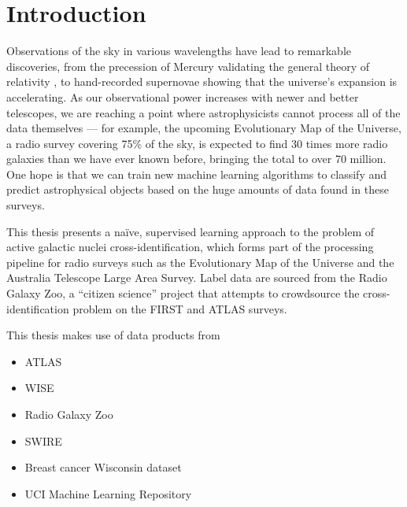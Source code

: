
\chapter{Introduction}
\label{cha:intro}

Observations of the sky in various wavelengths have lead to remarkable discoveries, from the precession of Mercury validating the general theory of relativity , to hand-recorded supernovae showing that the universe's expansion is accelerating. As our observational power increases with newer and better telescopes, we are reaching a point where astrophysicists cannot process all of the data themselves --- for example, the upcoming Evolutionary Map of the Universe, a radio survey covering 75\% of the sky, is expected to find 30 times more radio galaxies than we have ever known before, bringing the total to over 70 million. One hope is that we can train new machine learning algorithms to classify and predict astrophysical objects based on the huge amounts of data found in these surveys.

This thesis presents a naïve, supervised learning approach to the problem of active galactic nuclei cross-identification, which forms part of the processing pipeline for radio surveys such as the Evolutionary Map of the Universe and the Australia Telescope Large Area Survey. Label data are sourced from the Radio Galaxy Zoo, a ``citizen science'' project that attempts to crowdsource the cross-identification problem on the FIRST and ATLAS surveys.


This thesis makes use of data products from
\begin{itemize}
    \item ATLAS
    \item WISE
    \item Radio Galaxy Zoo
    \item SWIRE
    \item Breast cancer Wisconsin dataset
    \item UCI Machine Learning Repository
\end{itemize}